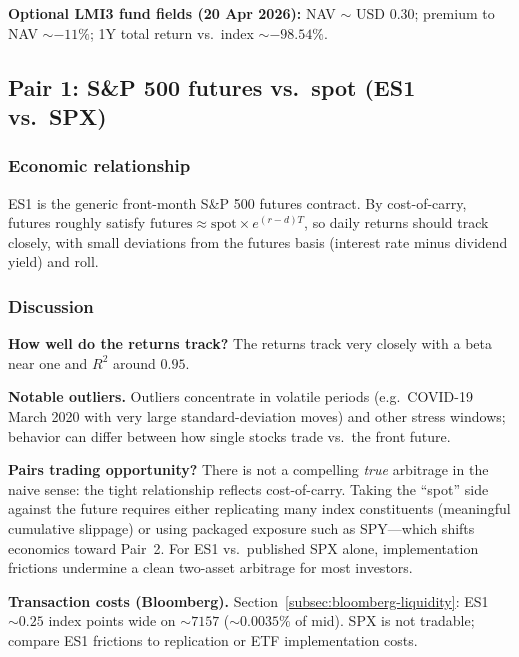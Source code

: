 \smallskip
\noindent\textbf{Optional LMI3 fund fields (20 Apr 2026):} NAV $\sim$ USD 0.30; premium to NAV $\sim -11\%$; 1Y total return vs.\ index $\sim -98.54\%$.

\subsection{Pair 1: S\&P 500 futures vs.\ spot (ES1 vs.\ SPX)}
\label{subsec:pair1}

\subsubsection*{Economic relationship}
ES1 is the generic front-month S\&P 500 futures contract. By cost-of-carry, futures roughly satisfy $\text{futures} \approx \text{spot} \times e^{(r-d)T}$, so daily returns should track closely, with small deviations from the futures basis (interest rate minus dividend yield) and roll.


\subsubsection*{Discussion}

\textbf{How well do the returns track?}
The returns track very closely with a beta near one and $R^2$ around $0.95$.

\textbf{Notable outliers.}
Outliers concentrate in volatile periods (e.g.\ COVID-19 March 2020 with very large standard-deviation moves) and other stress windows; behavior can differ between how single stocks trade vs.\ the front future.

\textbf{Pairs trading opportunity?}
There is not a compelling \emph{true} arbitrage in the naive sense: the tight relationship reflects cost-of-carry. Taking the ``spot'' side against the future requires either replicating many index constituents (meaningful cumulative slippage) or using packaged exposure such as SPY---which shifts economics toward Pair~2. For ES1 vs.\ published SPX alone, implementation frictions undermine a clean two-asset arbitrage for most investors.

\textbf{Transaction costs (Bloomberg).}
Section~\ref{subsec:bloomberg-liquidity}: ES1 $\sim 0.25$ index points wide on $\sim 7157$ ($\sim 0.0035\%$ of mid). SPX is not tradable; compare ES1 frictions to replication or ETF implementation costs.

